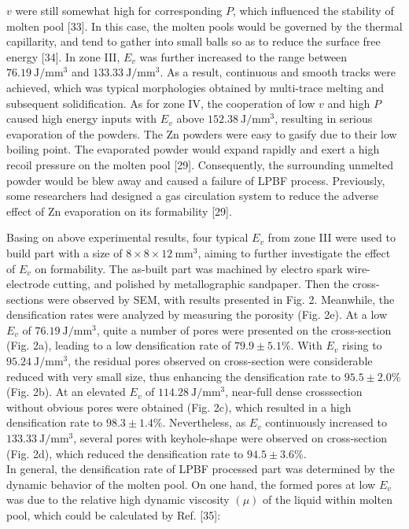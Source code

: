 \documentclass[10pt]{article}
\begin{document}
$v$ were still somewhat high for corresponding $P$, which influenced the stability of molten pool [33]. In this case, the molten pools would be governed by the thermal capillarity, and tend to gather into small balls so as to reduce the surface free energy [34]. In zone III, $E_{v}$ was further increased to the range between $76.19 \mathrm{~J} / \mathrm{mm}^{3}$ and $133.33 \mathrm{~J} / \mathrm{mm}^{3}$. As a result, continuous and smooth tracks were achieved, which was typical morphologies obtained by multi-trace melting and subsequent solidification. As for zone IV, the cooperation of low $v$ and high $P$ caused high energy inputs with $E_{v}$ above $152.38 \mathrm{~J} / \mathrm{mm}^{3}$, resulting in serious evaporation of the powders. The $\mathrm{Zn}$ powders were easy to gasify due to their low boiling point. The evaporated powder would expand rapidly and exert a high recoil pressure on the molten pool [29]. Consequently, the surrounding unmelted powder would be blew away and caused a failure of LPBF process. Previously, some researchers had designed a gas circulation system to reduce the adverse effect of $\mathrm{Zn}$ evaporation on its formability [29].

Basing on above experimental results, four typical $E_{v}$ from zone III were used to build part with a size of $8 \times 8 \times 12 \mathrm{~mm}^{3}$, aiming to further investigate the effect of $E_{v}$ on formability. The as-built part was machined by electro spark wire-electrode cutting, and polished by metallographic sandpaper. Then the cross-sections were observed by SEM, with results presented in Fig. 2. Meanwhile, the densification rates were analyzed by measuring the porosity (Fig. 2e). At a low $E_{v}$ of $76.19 \mathrm{~J} / \mathrm{mm}^{3}$, quite a number of pores were presented on the cross-section (Fig. 2a), leading to a low densification rate of $79.9 \pm 5.1 \%$. With $E_{v}$ rising to $95.24 \mathrm{~J} / \mathrm{mm}^{3}$, the residual pores observed on cross-section were considerable reduced with very small size, thus enhancing the densification rate to $95.5 \pm 2.0 \%$ (Fig. 2b). At an elevated $E_{v}$ of $114.28 \mathrm{~J} / \mathrm{mm}^{3}$, near-full dense crosssection without obvious pores were obtained (Fig. 2c), which resulted in a high densification rate to $98.3 \pm 1.4 \%$. Nevertheless, as $E_{v}$ continuously increased to $133.33 \mathrm{~J} / \mathrm{mm}^{3}$, several pores with keyhole-shape were observed on cross-section (Fig. 2d), which reduced the densification rate to $94.5 \pm 3.6 \%$.\\
In general, the densification rate of LPBF processed part was determined by the dynamic behavior of the molten pool. On one hand, the formed pores at low $E_{v}$ was due to the relative high dynamic viscosity $(\mu)$ of the liquid within molten pool, which could be calculated by Ref. [35]:
\end{document}
